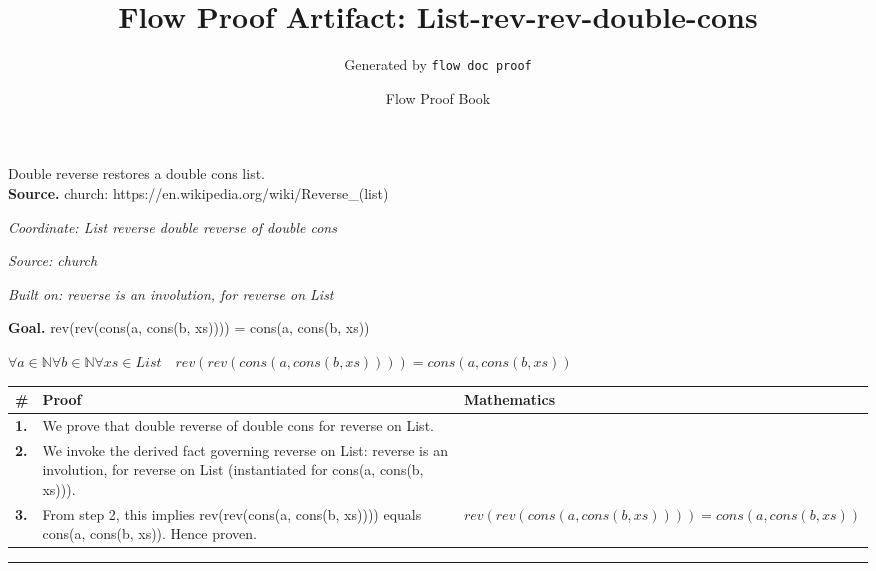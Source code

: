 \documentclass[11pt]{article}
\title{Flow Proof Artifact: List-rev-rev-double-cons}
\author{Generated by \texttt{flow doc proof}}
\date{Flow Proof Book}
\theoremstyle{definition}
\begin{document}
\maketitle
Double reverse restores a double cons list.\\[0.5em]
\textbf{Source.} church: https://en.wikipedia.org/wiki/Reverse\_(list)\\[0.5em]
\bigskip
{}\par
\smallskip\noindent\textit{Coordinate: List \cdot reverse \cdot double reverse of double cons}\par
\smallskip\noindent\textit{Source: church}\par
\smallskip\noindent\textit{Built on: reverse is an involution, for reverse on List}\par
\medskip
\noindent\textbf{Goal.} rev(rev(cons(a, cons(b, xs)))) = cons(a, cons(b, xs))\par
\noindent$\displaystyle \forall a \in \mathbb{N} \forall b \in \mathbb{N} \forall xs \in List\quad rev(rev(cons(a, cons(b, xs)))) = cons(a, cons(b, xs))$\par
\medskip
\noindent
\begin{tabular}{@{} >{\raggedright\arraybackslash}p{} >{\raggedright\arraybackslash}p{} >{\raggedleft\arraybackslash}p{} @{}}
\textbf{\#} & \textbf{Proof} & \textbf{Mathematics} \\
\midrule
\textbf{1.} & We prove that double reverse of double cons for reverse on List. & \\[0.45em]
\textbf{2.} & We invoke the derived fact governing reverse on List: reverse is an involution, for reverse on List (instantiated for cons(a, cons(b, xs))). & \\[0.45em]
\textbf{3.} & From step 2, this implies rev(rev(cons(a, cons(b, xs)))) equals cons(a, cons(b, xs)). Hence proven. & $\displaystyle rev(rev(cons(a, cons(b, xs)))) = cons(a, cons(b, xs))$ \\[0.45em]
\bottomrule
\end{tabular}
\label{thm:List-reverse-double_reverse_of_double_cons}
\par\medskip\hrule
\end{document}
